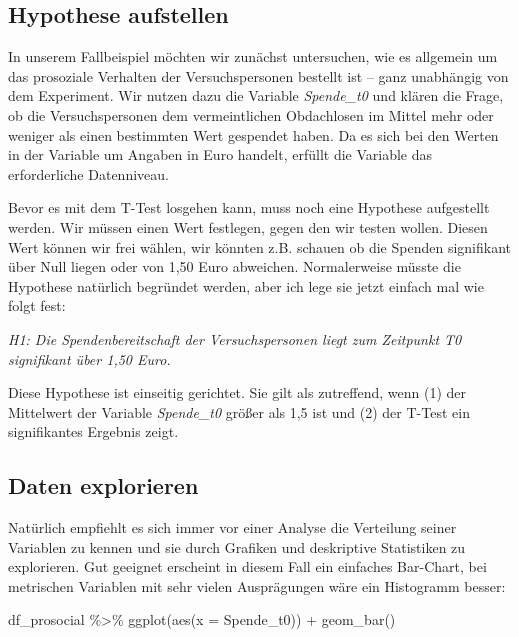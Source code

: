 \documentclass[
]{book}
\newenvironment{Shaded}{\begin{snugshade}}{\end{snugshade}}
\newcommand{\AttributeTok}[1]{\textcolor[rgb]{0.77,0.63,0.00}{#1}}
\newcommand{\FunctionTok}[1]{\textcolor[rgb]{0.00,0.00,0.00}{#1}}
\newcommand{\NormalTok}[1]{#1}
\newcommand{\SpecialCharTok}[1]{\textcolor[rgb]{0.00,0.00,0.00}{#1}}
\begin{document}
\hypertarget{hypothese-aufstellen}{%
\subsection{Hypothese aufstellen}\label{hypothese-aufstellen}}

In unserem Fallbeispiel möchten wir zunächst untersuchen, wie es allgemein um das prosoziale Verhalten der Versuchspersonen bestellt ist -- ganz unabhängig von dem Experiment. Wir nutzen dazu die Variable \emph{Spende\_t0} und klären die Frage, ob die Versuchspersonen dem vermeintlichen Obdachlosen im Mittel mehr oder weniger als einen bestimmten Wert gespendet haben. Da es sich bei den Werten in der Variable um Angaben in Euro handelt, erfüllt die Variable das erforderliche Datenniveau.

Bevor es mit dem T-Test losgehen kann, muss noch eine Hypothese aufgestellt werden. Wir müssen einen Wert festlegen, gegen den wir testen wollen. Diesen Wert können wir frei wählen, wir könnten z.B. schauen ob die Spenden signifikant über Null liegen oder von 1,50 Euro abweichen. Normalerweise müsste die Hypothese natürlich begründet werden, aber ich lege sie jetzt einfach mal wie folgt fest:

\emph{H1: Die Spendenbereitschaft der Versuchspersonen liegt zum Zeitpunkt T0 signifikant über 1,50 Euro.}

Diese Hypothese ist einseitig gerichtet. Sie gilt als zutreffend, wenn (1) der Mittelwert der Variable \emph{Spende\_t0} größer als 1,5 ist und (2) der T-Test ein signifikantes Ergebnis zeigt.

\hypertarget{daten-explorieren}{%
\subsection{Daten explorieren}\label{daten-explorieren}}

Natürlich empfiehlt es sich immer vor einer Analyse die Verteilung seiner Variablen zu kennen und sie durch Grafiken und deskriptive Statistiken zu explorieren. Gut geeignet erscheint in diesem Fall ein einfaches Bar-Chart, bei metrischen Variablen mit sehr vielen Ausprägungen wäre ein Histogramm besser:

\begin{Shaded}
\begin{Highlighting}[]
\NormalTok{df\_prosocial }\SpecialCharTok{\%\textgreater{}\%} 
  \FunctionTok{ggplot}\NormalTok{(}\FunctionTok{aes}\NormalTok{(}\AttributeTok{x =}\NormalTok{ Spende\_t0)) }\SpecialCharTok{+}
  \FunctionTok{geom\_bar}\NormalTok{() }
\end{Highlighting}
\end{Shaded}
\end{document}
